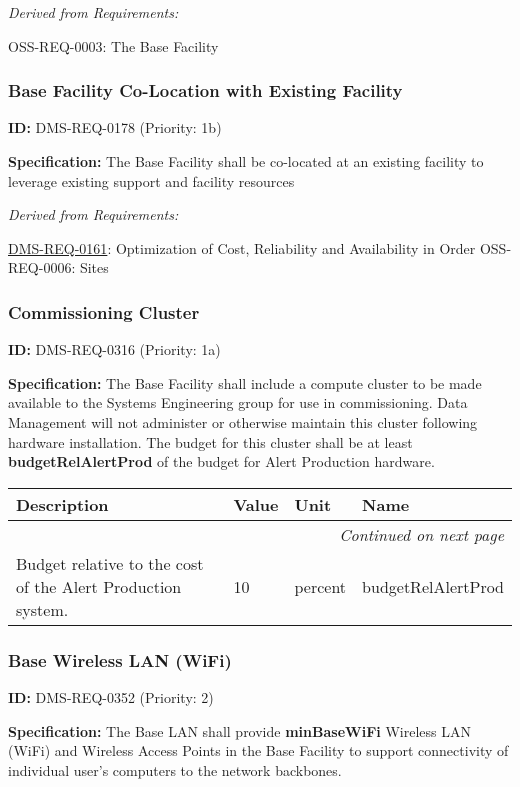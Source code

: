 \documentclass[SE,toc,lsstdraft]{lsstdoc}
\makeatletter
\newcommand{\paramname}[1]{\hspace{0pt}#1}
\newcommand{\unitname}[1]{\hspace{0pt}#1}
\newenvironment{parameters}[0]{%
\setlength\LTleft{0pt}
\setlength\LTright{\fill}
\begin{small}
\begin{longtable}[]{|p{0.49\textwidth}|l|p{0.6in}|p{1.70in}@{}|}

\hline \textbf{Description} & \textbf{Value} & \textbf{Unit} & \textbf{Name} \\ \hline
\endhead

\hline \multicolumn{4}{r}{\emph{Continued on next page}} \\
\endfoot

\hline\hline
\endlastfoot
}{%
\hline
\end{longtable}
\end{small}
}
\makeatother
\begin{document}
\emph{Derived from Requirements:}

OSS-REQ-0003:
The Base Facility \newline

\subsubsection{Base Facility Co-Location with Existing Facility}

\label{DMS-REQ-0178}
\textbf{ID:} DMS-REQ-0178 (Priority: 1b)

\textbf{Specification:} The Base Facility shall be co-located at an existing facility to leverage existing support and facility resources

\emph{Derived from Requirements:}

\hyperref[DMS-REQ-0161]{DMS-REQ-0161}:
Optimization of Cost, Reliability and Availability in Order \newline
OSS-REQ-0006:
Sites \newline

\subsubsection{Commissioning Cluster}

\label{DMS-REQ-0316}
\textbf{ID:} DMS-REQ-0316 (Priority: 1a)

\textbf{Specification:} The Base Facility shall include a compute cluster to be made available to the Systems Engineering group for use in commissioning.  Data Management will not administer or otherwise maintain this cluster following hardware installation. The budget for this cluster shall be at least \textbf{budgetRelAlertProd} of the budget for Alert Production hardware.

\begin{parameters}
Budget relative to the cost of the Alert Production system.
&
10
&
\unitname{%
percent
}
&
\paramname{%
budgetRelAlertProd
} \\\hline
\end{parameters}

\subsubsection{Base Wireless LAN (WiFi)}

\label{DMS-REQ-0352}
\textbf{ID:} DMS-REQ-0352 (Priority: 2)

\textbf{Specification:}
The Base LAN shall provide \textbf{minBaseWiFi} Wireless LAN (WiFi) and Wireless Access Points in the Base Facility to support connectivity of individual user's computers to the network backbones.
\end{document}
